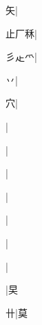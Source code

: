 \begin{multicols}{2}
{{\cjk{}{\cnsym{}　}{\cnsym{}　}矢}|{}\par
{\cjk{}止厂秝}|{}\par
{\cjk{}彡{\cnxBabel{}龰}{爫}}|{}\par
{\cjk{}{\cnsym{}　}{\cnsym{}　}丷}|{}\par
{\cjk{}{\cnsym{}　}{\cnsym{}　}穴}|{}\par
{}|{}\par
{}|{}\par
{}|{}\par
{}|{}\par
{\cjk{}{\cnsym{}　}{\cnsym{}　}{\cnsym{}　}}|{}\par
{}|{}\par
{\cjk{}{\cnsym{}　}{\cnsym{}　}{\cnsym{}　}}|{}\par
{\cjk{}{\cnsym{}　}{\cnsym{}　}{\cnsym{}　}}|{\cjk{}旲}\par
{\cjk{}{\cnsym{}　}{\cnsym{}　}卄}|{\cjk{}莫}\par
}
\end{multicols}
